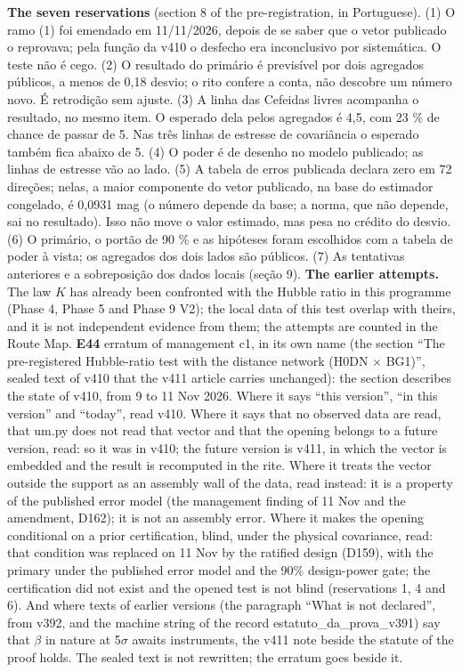 \textbf{The seven reservations} (section 8 of the pre-registration, in Portuguese). (1) O ramo (1) foi emendado em 11/11/2026, depois de se saber que o vetor publicado o reprovava; pela função da v410 o desfecho era inconclusivo por sistemática. O teste não é cego. (2) O resultado do primário é previsível por dois agregados públicos, a menos de 0,18 desvio; o rito confere a conta, não descobre um número novo. É retrodição sem ajuste. (3) A linha das Cefeidas livres acompanha o resultado, no mesmo item. O esperado dela pelos agregados é 4,5, com 23 \% de chance de passar de 5. Nas três linhas de estresse de covariância o esperado também fica abaixo de 5. (4) O poder é de desenho no modelo publicado; as linhas de estresse vão ao lado. (5) A tabela de erros publicada declara zero em 72 direções; nelas, a maior componente do vetor publicado, na base do estimador congelado, é 0,0931 mag (o número depende da base; a norma, que não depende, sai no resultado). Isso não move o valor estimado, mas pesa no crédito do desvio. (6) O primário, o portão de 90 \% e as hipóteses foram escolhidos com a tabela de poder à vista; os agregados dos dois lados são públicos. (7) As tentativas anteriores e a sobreposição dos dados locais (seção 9).
\textbf{The earlier attempts.} The law $K$ has already been confronted with the Hubble ratio in this programme (Phase 4, Phase 5 and Phase 9 V2); the local data of this test overlap with theirs, and it is not independent evidence from them; the attempts are counted in the Route Map.
\textbf{E44} erratum of management c1, in its own name (the section “The pre-registered Hubble-ratio test with the distance network (H0DN $\times$ BG1)”, sealed text of v410 that the v411 article carries unchanged): the section describes the state of v410, from 9 to 11 Nov 2026. Where it says “this version”, “in this version” and “today”, read v410. Where it says that no observed data are read, that um.py does not read that vector and that the opening belongs to a future version, read: so it was in v410; the future version is v411, in which the vector is embedded and the result is recomputed in the rite. Where it treats the vector outside the support as an assembly wall of the data, read instead: it is a property of the published error model (the management finding of 11 Nov and the amendment, D162); it is not an assembly error. Where it makes the opening conditional on a prior certification, blind, under the physical covariance, read: that condition was replaced on 11 Nov by the ratified design (D159), with the primary under the published error model and the 90\% design-power gate; the certification did not exist and the opened test is not blind (reservations 1, 4 and 6). And where texts of earlier versions (the paragraph “What is not declared”, from v392, and the machine string of the record estatuto\_da\_prova\_v391) say that $\beta$ in nature at 5$\sigma$ awaits instruments, the v411 note beside the statute of the proof holds. The sealed text is not rewritten; the erratum goes beside it.
